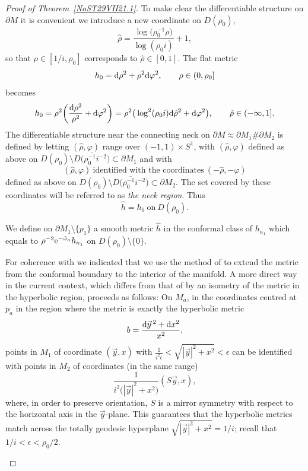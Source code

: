 \documentclass[pdftex]{sigma}
\numberwithin{equation}{section}
\newcommand{\rhozero}{\red{\rho_0}}
\newcommand{\red}[1]{{\color{red}#1}}
\newcommand{\zomega}{\mathring{\omega}}%
\newcommand{\hrho}{\hat\rho}
\renewcommand{\red}[1]{#1}
\begin{document}
\begin{proof}[Proof of Theorem~\ref{NoST29VII21.1}]
To make clear the differentiable structure on $\partial M$ it is convenient we introduce a new coordinate on $\red{D(}\rhozero )$,
\begin{equation}\label{25XI21.1}
 \hrho = \frac{ \red{\log} \big( \rhozero ^{-1} \rho\big)}{ \red{\log} ( \rhozero i )}+1,
\end{equation}
so that $\rho\in [1/i,\rhozero ]$ corresponds to $ \hrho\in [0,1]$. The flat metric
\[
 h_0 = {\rm d}\rho^2 + \rho^2 {\rm d}\varphi^2,
 \qquad
 \rho\in (0,\rhozero ]
\]
becomes
\begin{equation*}%
 h_0 =\rho^2
 \bigg(
 \frac{{\rm d}\rho^2}{\rho^2}+ {\rm d}\varphi^2
 \bigg)
 = \rho^2
 \big( \red{\log}^2( \rhozero i) {\rm d}\hrho^2 + {\rm d}\varphi^2 \big)
,
 \qquad
 \hrho\in (-\infty,1]
.
\end{equation*}
%
The differentiable structure near the connecting neck on
$\partial M \approx \partial M_1 \# \partial M_2$ is defined by letting $(\hrho,\varphi)$ range over $(-1,1)\times S^1$, with $(\hrho,\varphi) $
defined as above on
$D(\rhozero) \setminus \red{\overline{D\big(\rhozero^{-1}i^{-2}\big)}}\subset \partial M_1$
and with
\begin{equation}\label{2VI22.41}
 (\hrho,\varphi) \ \text{identified with the coordinates} \ (- \hrho,-\varphi)
\end{equation}
%
defined as above on $D(\rhozero) \setminus \red{\overline{D\big(\rhozero^{-1}i^{-2}\big)}}\subset \partial M_2$.
 The set covered by these coordinates will be referred to as \emph{the neck region}.
Thus
\[
 \hat h = h_0 \ \text{on} \ D(\rho_0).
\]

We define on $\partial M_1\setminus \{p_1\}$ a smooth metric $\hat h $ in the conformal class of $h_{\kappa_1}$ which equals to $\rho^{-2}{{\rm e}^{-\zomega_a}}h_{\kappa_1}$ on $D(\rhozero)\setminus \{0\}$.

\begin{Remark}
For coherence with \cite{ChDelayHPETv1, CDW} we indicated that we use the method of \cite[Section~2]{CDW} to extend the metric from the conformal boundary to the interior of the manifold. A more direct way in the current context, which differs from that of \cite[Section~2]{CDW} by an isometry of the metric in the hyperbolic region, proceeds as follows:
On $M_a$, in the coordinates centred at $p_a$ in the region where the metric is exactly the hyperbolic metric
\[
b=\frac{{\rm d}\vec y\,^2+{\rm d}x^2}{x^2},
\]
points in $M_1$ of coordinate $(\vec y,x)$ with $\frac{1}{i^2\epsilon}<\sqrt{|\vec y|^2+x^2}<\epsilon$ can be identified with points in $M_2$ of coordinates (in the same range)
\[
 \frac1{i^2\big(|\vec y|^2+x^2\big)}(S\vec y,x),
\]
where, in order to preserve orientation, $S$ is a mirror symmetry with respect to the horizontal axis in the $\vec y$-plane.
This guarantees that the hyperbolic metrics match across the totally geodesic hyperplane $\sqrt{|\vec y|^2+x^2}=1/i$; recall that $1/i< \epsilon < \rho_0/2$.
\end{Remark}


\end{proof}
\end{document}
